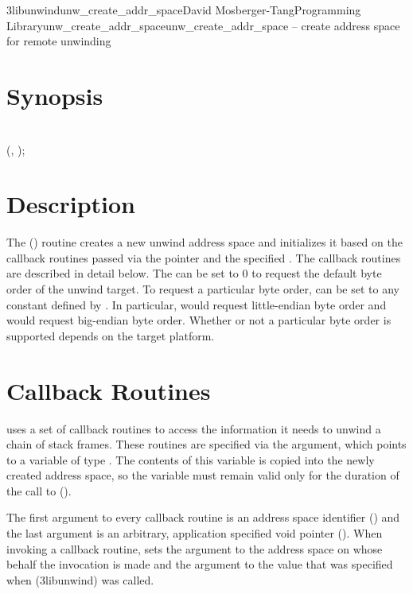 \documentclass{article}
\begin{document}
\begin{Name}{3libunwind}{unw\_create\_addr\_space}{David Mosberger-Tang}{Programming Library}{unw\_create\_addr\_space}unw\_create\_addr\_space -- create address space for remote unwinding
\end{Name}

\section{Synopsis}

\\

 (,  );\\

\section{Description}

The () routine creates a new unwind
address space and initializes it based on the callback routines
passed via the  pointer and the specified .
The callback routines are described in detail below.  The
 can be set to 0 to request the default byte order of
the unwind target.  To request a particular byte order,
 can be set to any constant defined by
.  In particular,  would
request little-endian byte order and  would
request big-endian byte order.  Whether or not a particular byte order
is supported depends on the target platform.

\section{Callback Routines}

 uses a set of callback routines to access the
information it needs to unwind a chain of stack frames.  These
routines are specified via the  argument, which points to a
variable of type .  The contents of this
variable is copied into the newly created address space, so the
variable must remain valid only for the duration of the call to
().

The first argument to every callback routine is an address space
identifier () and the last argument is an arbitrary,
application specified void pointer ().  When invoking a
callback routine,  sets the  argument to the
address space on whose behalf the invocation is made and the 
argument to the value that was specified when
(3libunwind) was called.
\end{document}
